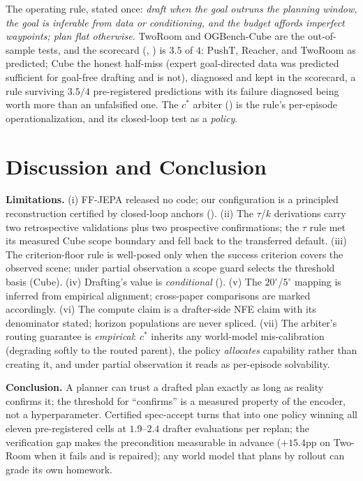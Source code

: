 \documentclass{article}
\newcommand{\degc}[1]{$#1^\circ$}
\begin{document}
The operating rule, stated once: \emph{draft when the goal outruns the planning
window, the goal is inferable from data or conditioning, and the budget affords
imperfect waypoints; plan flat otherwise.} TwoRoom and OGBench-Cube are the
out-of-sample tests, and the scorecard (,
) is $3.5$ of $4$: PushT, Reacher, and TwoRoom as
predicted; Cube the honest half-miss (expert goal-directed data was predicted
sufficient for goal-free drafting and is not), diagnosed and kept in the
scorecard, a rule surviving $3.5/4$ pre-registered predictions with its
failure diagnosed being worth more than an unfalsified one. The $c^{*}$
arbiter () is the rule's per-episode
operationalization, and  its closed-loop test as a
\emph{policy}.



\section{Discussion and Conclusion}
\label{sec:discussion}
\textbf{Limitations.} (i) FF-JEPA released no code; our configuration is a
principled reconstruction certified by closed-loop anchors
(). (ii) The $\tau$/$k$ derivations carry two retrospective
validations plus two prospective confirmations; the $\tau$ rule met its
measured Cube scope boundary and fell back to the transferred default. (iii)
The criterion-floor rule is well-posed only when the success criterion covers
the observed scene; under partial observation a scope guard selects the
threshold basis (Cube). (iv) Drafting's value is \emph{conditional}
(). (v) The \degc{20}/\degc{5} mapping is inferred from
empirical alignment; cross-paper comparisons are marked accordingly. (vi) The
compute claim is a drafter-side NFE claim with its denominator stated;
horizon populations are never spliced.
(vii) The arbiter's routing guarantee is \emph{empirical}: $c^{*}$ inherits
any world-model mis-calibration (degrading softly to the routed parent), the
policy \emph{allocates} capability rather than creating it, and under partial
observation it reads as per-episode solvability.

\label{sec:conclusion}
\textbf{Conclusion.} A planner can trust a drafted plan exactly as long as
reality confirms it; the threshold for ``confirms'' is a measured property of
the encoder, not a hyperparameter. Certified spec-accept turns that into one
policy winning all eleven pre-registered cells at $1.9$--$2.4$ drafter
evaluations per replan; the verification gap makes the precondition
measurable in advance ($+15.4$pp on Two-Room when it fails and is repaired);
any world model that plans by rollout can grade its own homework.
\end{document}

